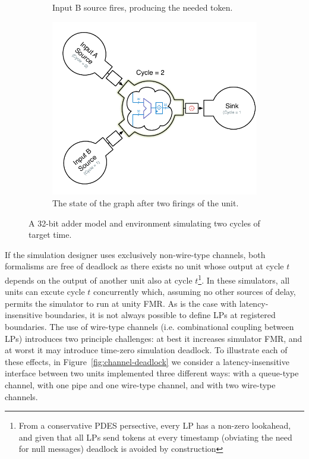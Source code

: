 \begin{figure}
\begin{subfigure}[t]{0.49\textwidth}
        \caption{Input B source fires, producing the needed token.}
    \end{subfigure}
    \begin{subfigure}[t]{0.49\textwidth}
        \includegraphics[width=\columnwidth]{figures/adder-example5.pdf}
        \caption{The state of the graph after two firings of the unit.}
    \end{subfigure}
    \centering
    \caption{A 32-bit adder model and environment simulating two cycles of target time.}
    \label{fig:adder-example}
\end{figure}

If the simulation designer uses exclusively non-wire-type channels, both
formalisms are free of deadlock as there exists no unit whose output at cycle
$t$ depends on the output of another unit also at cycle $t$\footnote{From a
conservative PDES persective, every LP has a non-zero lookahead, and given that
all LPs send tokens at every timestamp (obviating the need for null
messages) deadlock is avoided by construction}. In these simulators, all units
can excute cycle $t$ concurrently which, assuming no other sources of delay,
permits the simulator to run at unity FMR.  As is the case with latency-insensitive boundaries, it is not always possible to define LPs
at registered boundaries.  The use of wire-type channels (i.e. combinational
coupling between LPs) introduces two principle challenges: at best it
increases simulator FMR, and at worst it may introduce time-zero simulation
deadlock. To illustrate each of these effects, in Figure~\ref{fig:channel-deadlock} we consider a
latency-insensitive interface between two units implemented three different ways: with a queue-type
channel, with one pipe and one wire-type channel, and with two wire-type channels.

